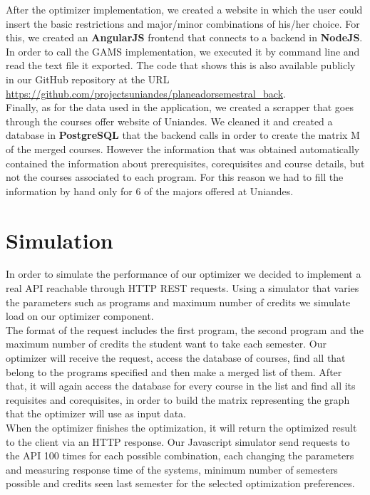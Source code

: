 \documentclass[journal]{IEEEtran}
\begin{document}
After the optimizer implementation, we created a website in which the user could insert the basic restrictions and major/minor combinations of his/her choice. For this, we created an \textbf{AngularJS} frontend that connects to a backend in \textbf{NodeJS}. In order to call the GAMS implementation, we executed it by command line and read the text file it exported. The code that shows this is also available publicly in our GitHub repository at the URL  \url{https://github.com/projectsuniandes/planeadorsemestral_back}.\\

Finally, as for the data used in the application, we created a scrapper that goes through the courses offer website of Uniandes. We cleaned it and created a database in \textbf{PostgreSQL} that the backend calls in order to create the matrix M of the merged courses. However the information that was obtained automatically contained the information about prerequisites, corequisites and course details, but not the courses associated to each program. For this reason we had to fill the information by hand only for 6 of the majors offered at Uniandes.\\

\section{Simulation}

In order to simulate the performance of our optimizer we decided to implement a real API reachable through HTTP REST requests. Using a simulator that varies the parameters such as programs and maximum number of credits we simulate load on our optimizer component.\\

The format of the request includes the first program, the second program and the maximum number of credits the student want to take each semester. Our optimizer will receive the request, access the database of courses, find all that belong to the programs specified and then make a merged list of them. After that, it will again access the database for every course in the list and find all its requisites and corequisites, in order to build the matrix representing the graph that the optimizer will use as input data. \\

When the optimizer finishes the optimization, it will return the optimized result to the client via an HTTP response. Our Javascript simulator send requests to the API 100 times for each possible combination, each changing the parameters and measuring response time of the systems,  minimum number of semesters possible and credits seen last semester for the selected optimization preferences. \\
\end{document}
